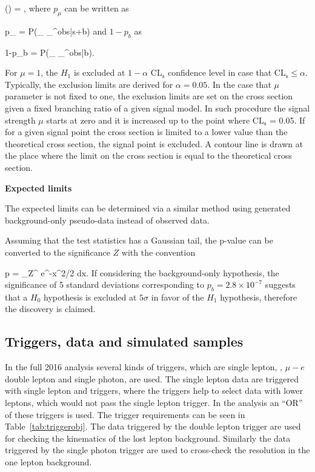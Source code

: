 {
(\mu) = ,
}
where $p_{\mu}$ can be written as

{
p_{\mu} = P(_{\mu} \geq {}_{\mu}^{obs}|s+b)
}
and $1-p_{b}$ as

{
1-p_{b} = P(_{\mu} \geq {}_{\mu}^{obs}|b).
}

For $\mu=1$, the $H_{1}$ is excluded at $1-\alpha$ $\mathrm{CL_{s}}$ confidence level in case that $\mathrm{CL_{s}} \leq \alpha$. Typically, the exclusion limits are derived for $\alpha = 0.05$. In the case that $\mu$ parameter is not fixed to one, the exclusion limits are set on the cross section given a fixed branching ratio of a given signal model. In such procedure the signal strength $\mu$ starts at zero and it is increased up to the point where $\mathrm{CL_{s}}$ = 0.05. If for a given signal point the cross section is limited to a lower value than the theoretical cross section, the signal point is excluded. A contour line is drawn at the place where the limit on the cross section is equal to the theoretical cross section.

\textbf{Expected limits}

The expected limits can be determined via a similar method using generated background-only pseudo-data instead of observed data. 

Assuming that the test statistics has a Gaussian tail, the p-value can be converted to the significance $Z$ with the convention

{
 p = \int_Z^{\infty}  e^{-x^{2}/2} dx.
}
If considering the background-only hypothesis, the significance of 5 standard deviations corresponding to $p_{b} = 2.8 \times 10^{-7} $ suggests that a $H_{0}$ hypothesis is excluded at $5 \sigma$ in favor of the $H_{1}$ hypothesis, therefore the discovery is claimed. %


\subsection{Triggers, data and simulated samples~\label{sec:trigger}}

In the full 2016 analysis several kinds of triggers, which are single lepton, \MET, $\mu-e$ double lepton  and single photon, are used. The single lepton data are triggered with single lepton and \MET triggers, where the \MET triggers help to select data with lower \pt leptons, which would not pass the single lepton trigger. In the analysis an ``OR'' of these triggers is used. The trigger requirements can be seen in Table~\ref{tab:triggerobj}. The data triggered by the double lepton trigger are used for checking the kinematics of the lost lepton background. Similarly the data triggered by the single photon trigger are used to cross-check the \MET resolution in  the one lepton background.

